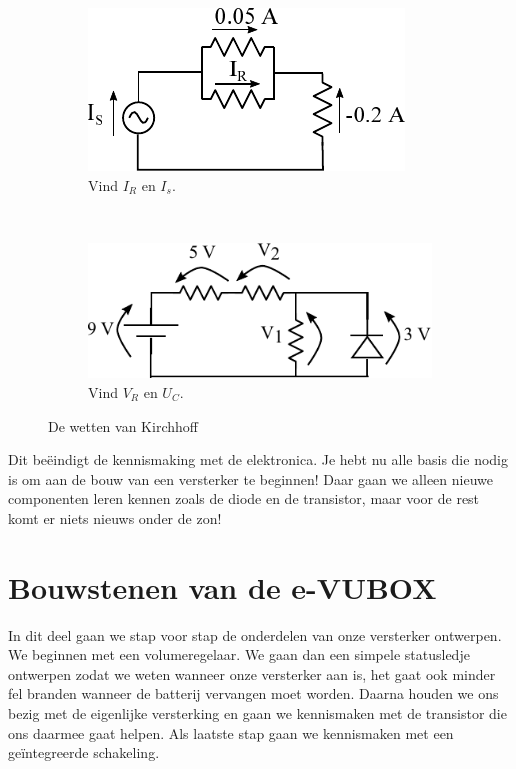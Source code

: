 \documentclass{article}
\begin{document}
			\begin{figure}[htbp]
				\centering
				\begin{subfigure}[b]{0.45\linewidth}
					\centering
					\includegraphics{kcl_oef.pdf}
					\caption{Vind $I_R$ en $I_s$.}
					\label{subfig:kcl_oef}
				\end{subfigure}
				~
				\begin{subfigure}[b]{0.45\linewidth}
					\centering
					\includegraphics[width=\linewidth]{kvl_oef.pdf}
					\caption{Vind $V_R$ en $U_C$. }
					\label{subfig:kvl_oef}
				\end{subfigure}
			\caption{De wetten van Kirchhoff}
			\label{fig:kirchoff_oef}
			\end{figure}

			Dit be\"eindigt de kennismaking met de elektronica. Je hebt nu alle basis die nodig is om aan de bouw van een versterker te beginnen! Daar gaan we alleen nieuwe componenten leren kennen zoals de diode en de transistor, maar voor de rest komt er niets nieuws onder de zon!

	\section{Bouwstenen van de e-VUBOX}
	\label{sec:bouwstenen}
		In dit deel gaan we stap voor stap de onderdelen van onze versterker ontwerpen. We beginnen met een volumeregelaar. We gaan dan een simpele statusledje ontwerpen zodat we weten wanneer onze versterker aan is, het gaat ook minder fel branden wanneer de batterij vervangen moet worden. Daarna houden we ons bezig met de eigenlijke versterking en gaan we kennismaken met de transistor die ons daarmee gaat helpen. 
		Als laatste stap gaan we kennismaken met een ge\"integreerde schakeling. 
\end{document}
